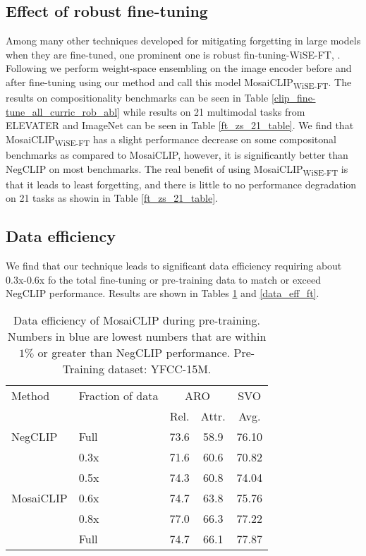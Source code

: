 \documentclass[11pt]{article}
\newcommand{\methodcomp}{MosaiCLIP}
\newcommand{\methodcompwiseft}{MosaiCLIP\textsubscript{WiSE-FT}}
\newcommand{\negclip}{NegCLIP}
\begin{document}
\subsection{Effect of robust fine-tuning}
\label{robust_ft_effect}
Among many other techniques developed for mitigating forgetting in large models when they are fine-tuned, one prominent one is robust fin-tuning-WiSE-FT, \citep{wortsman2022robust}. Following \citet{wortsman2022robust} we perform weight-space ensembling on the image encoder before and after fine-tuning using our method and call this model \methodcompwiseft{}. The results on compositionality benchmarks can be seen in Table \ref{clip_fine-tune_all_curric_rob_abl} while results on 21 multimodal tasks from ELEVATER and ImageNet can be seen in Table \ref{ft_zs_21_table}. We find that \methodcompwiseft{} has a slight performance decrease on some compositonal benchmarks as compared to \methodcomp{}, however, it is significantly better than \negclip{} on most benchmarks. The real benefit of using \methodcompwiseft{} is that it leads to least forgetting, and there is little to no performance degradation on 21 tasks as showin in Table \ref{ft_zs_21_table}.

\subsection{Data efficiency}
\label{data_eff}
We find that our technique leads to significant data efficiency requiring about 0.3x-0.6x fo the total fine-tuning or pre-training data to match or exceed \negclip{} performance. Results are shown in Tables \ref{data_eff_pretr} and \ref{data_eff_ft}.
\begin{table}[h!]
\small
\centering
    \begin{tabular}{llcc|c}
    \toprule
    {Method} & Fraction of data& \multicolumn{2}{c|}{ARO} & \multicolumn{1}{c}{SVO} \\
    \cmidrule(lr){3-4} \cmidrule(lr){5-5}
    & & Rel. & Attr. & Avg. \\
    \midrule
    \negclip{} & Full & 73.6 & 58.9 & 76.10 \\
    \midrule
    \multirow{5}{*}{\methodcomp{}} & 0.3x & 71.6 & {\color{blue}60.6} & 70.82 \\
    & 0.5x & {\color{blue}74.3} & 60.8 & 74.04 \\
    & 0.6x & 74.7 & 63.8 & {\color{blue}75.76} \\
    & 0.8x & 77.0 & 66.3 & 77.22 \\
    & Full & 74.7 & 66.1 & 77.87 \\
    \bottomrule
    \end{tabular}

    \caption{Data efficiency of \methodcomp{} during pre-training. Numbers in blue are lowest numbers that are within $1\%$ or greater than \negclip{} performance. Pre-Training dataset: YFCC-15M.}
    \label{data_eff_pretr}
\end{table}
\end{document}
